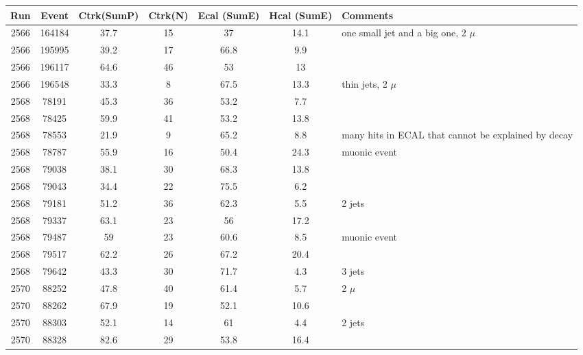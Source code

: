 \begin{tabular}{ccccccl}
	\toprule
	Run & Event & Ctrk(SumP) & Ctrk(N) & Ecal (SumE) & Hcal (SumE) & Comments \\
	\midrule
	2566 & 164184 & 37.7 & 15 & 37   & 14.1 & one small jet and a big one, 2 $\mu$ \\
	2566 & 195995 & 39.2 & 17 & 66.8 & 9.9  &  \\
	2566 & 196117 & 64.6 & 46 & 53   & 13   &  \\
	2566 & 196548 & 33.3 & 8  & 67.5 & 13.3 & thin jets, 2 $\mu$ \\
	2568 & 78191  & 45.3 & 36 & 53.2 & 7.7  & \\
	2568 & 78425  & 59.9 & 41 & 53.2 & 13.8 & \\
	2568 & 78553  & 21.9 & 9  & 65.2 & 8.8  & many hits in ECAL that cannot be explained by decay \\
	2568 & 78787  & 55.9 & 16 & 50.4 & 24.3 & muonic event \\
	2568 & 79038  & 38.1 & 30 & 68.3 & 13.8 & \\
	2568 & 79043  & 34.4 & 22 & 75.5 & 6.2  & \\
	2568 & 79181  & 51.2 & 36 & 62.3 & 5.5  & 2 jets \\
	2568 & 79337  & 63.1 & 23 & 56   & 17.2 & \\
	2568 & 79487  & 59   & 23 & 60.6 & 8.5  & muonic event  \\
	2568 & 79517  & 62.2 & 26 & 67.2 & 20.4 &  \\
	2568 & 79642  & 43.3 & 30 & 71.7 & 4.3  & 3 jets  \\
	2570 & 88252  & 47.8 & 40 & 61.4 & 5.7  & 2 $\mu$  \\
	2570 & 88262  & 67.9 & 19 & 52.1 & 10.6 &  \\
	2570 & 88303  & 52.1 & 14 & 61   & 4.4  & 2 jets  \\
	2570 & 88328  & 82.6 & 29 & 53.8 & 16.4 & \\
	\bottomrule
\end{tabular}